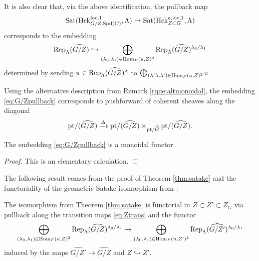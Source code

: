 It is also clear that, via the above identification, the pullback map 
\begin{equation*}
    \textnormal{Sat}(\mathrm{Hck}_{G/Z,\mathrm{Spd}(C)}^{\mathrm{loc},1},\Lambda) \to \textnormal{Sat}(\mathrm{Hck}^{e,\mathrm{loc},1}_{Z \subset G},\Lambda)
\end{equation*}
corresponds to the embedding
\begin{equation}\label{eq:G/Zpullback}
\textnormal{Rep}_{\Lambda}(\widehat{G/Z}) \hookrightarrow \bigoplus_{(\lambda_{0}, \lambda_{1}) \in \mathrm{Hom}_{F}(u, Z)^{2}} \textnormal{Rep}_{\Lambda}(\widehat{G/Z})^{\lambda_{0}/\lambda_{1}}
\end{equation}
determined by sending $\pi \in \textnormal{Rep}_{\Lambda}(\widehat{G/Z})^{\lambda}$ to $\bigoplus_{(\lambda' \lambda,\lambda') \in \mathrm{Hom}_{F}(u,Z)^{2}} \pi$. 

\begin{rque}
Using the alternative description from Remark \ref{rque:altmonoidal}, the embedding \eqref{eq:G/Zpullback} corresponds to pushforward of coherent sheaves along the diagonal
\begin{equation*}
\mathrm{pt}/(\widehat{G/Z}) \xrightarrow{\Delta} \mathrm{pt}/(\widehat{G/Z}) \times_{\mathrm{pt}/\widehat{G}} \mathrm{pt}/(\widehat{G/Z}).
\end{equation*}
\end{rque}

\begin{lem}
    The embedding \eqref{eq:G/Zpullback} is a monoidal functor.
\end{lem}

\begin{proof}
    This is an elementary calculation.
\end{proof}

The following result comes from the proof of Theorem \ref{thm:satake} and the functoriality of the geometric Satake isomorphism from \cite{Geometrization}:

\begin{corol}\label{corol:satZfunc} The isomorphism from Theorem \ref{thm:satake} is functorial in $Z \subset Z' \subset Z_{G}$ via pullback along the transition maps \eqref{eq:Ztrans} and the functor
\begin{equation*}
    \bigoplus_{(\lambda_{0}, \lambda_{1}) \in \mathrm{Hom}_{F}(u, Z)^{2}} \textnormal{Rep}_{\Lambda}(\widehat{G/Z})^{\lambda_{0}/\lambda_{1}}\to \bigoplus_{(\lambda_{0}, \lambda_{1}) \in \mathrm{Hom}_{F}(u, Z')^{2}} \textnormal{Rep}_{\Lambda}(\widehat{G/Z'})^{\lambda_{0}/\lambda_{1}}
\end{equation*}
induced by the maps $\widehat{G/Z'} \to \widehat{G/Z}$ and $Z \hookrightarrow Z'$.
\end{corol}

